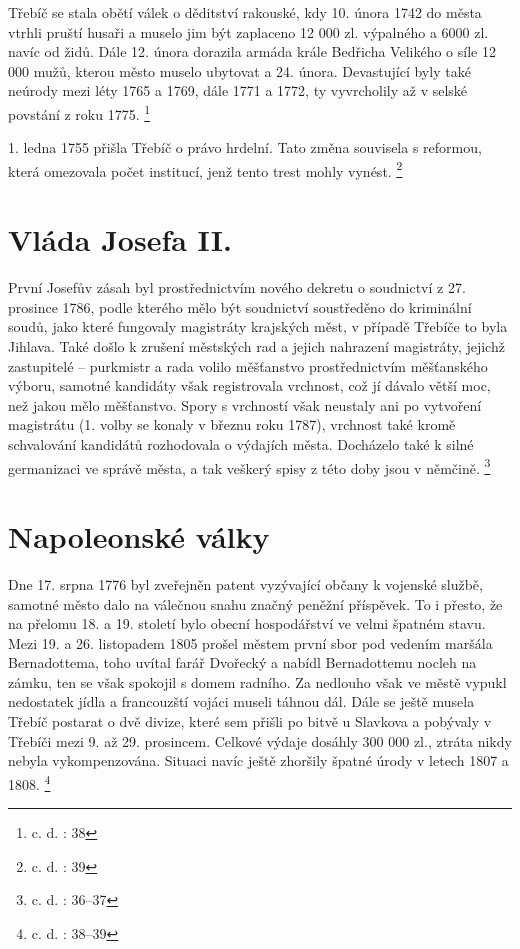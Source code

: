 \documentclass[a4paper,oneside,12p]{report}
\begin{document}
Třebíč se stala obětí válek o děditství rakouské, kdy 10. února 1742 do města vtrhli pruští husaři a muselo jim být zaplaceno 12 000 zl. výpalného a 6000 zl. navíc od židů.
Dále 12. února dorazila armáda krále Bedřicha Velikého o síle 12 000 mužů, kterou město muselo ubytovat a 24. února.
Devastující byly také neúrody mezi léty 1765 a 1769, dále 1771 a 1772, ty vyvrcholily až v selské povstání z roku 1775. \footnote{c. d. : 38}

1. ledna 1755 přišla Třebíč o právo hrdelní.
Tato změna souvisela s reformou, která omezovala počet institucí, jenž tento trest mohly vynést. \footnote{c. d. : 39}

\section{Vláda Josefa II.}

První Josefův zásah byl prostřednictvím nového dekretu o soudnictví z 27. prosince 1786, podle kterého mělo být soudnictví soustředěno do kriminální soudů, jako které fungovaly magistráty krajských měst, v případě Třebíče to byla Jihlava.
Také došlo k zrušení městských rad a jejich nahrazení magistráty, jejichž zastupitelé -- purkmistr a rada volilo měšťanstvo prostřednictvím měšťanského výboru, samotné kandidáty však registrovala vrchnost, což jí dávalo větší moc, než jakou mělo měšťanstvo.
Spory s vrchností však neustaly ani po vytvoření magistrátu (1. volby se konaly v březnu roku 1787), vrchnost také kromě schvalování kandidátů rozhodovala o výdajích města.
Docházelo také k silné germanizaci ve správě města, a tak veškerý spisy z této doby jsou v němčině. \footnote{c. d. : 36--37}

\section{Napoleonské války}

Dne 17. srpna 1776 byl zveřejněn patent vyzývající občany k vojenské službě, samotné město dalo na válečnou snahu značný peněžní příspěvek.
To i přesto, že na přelomu 18. a 19. století bylo obecní hospodářství ve velmi špatném stavu.
Mezi 19. a 26. listopadem 1805 prošel městem první sbor pod vedením maršála Bernadottema, toho uvítal farář Dvořecký a nabídl Bernadottemu nocleh na zámku, ten se však spokojil s domem radního.
Za nedlouho však ve městě vypukl nedostatek jídla a francouzští vojáci museli táhnou dál.
Dále se ještě musela Třebíč postarat o dvě divize, které sem přišli po bitvě u Slavkova a pobývaly v Třebíči mezi 9. až 29. prosincem.
Celkové výdaje dosáhly 300 000 zl., ztráta nikdy nebyla vykompenzována.
Situaci navíc ještě zhoršily špatné úrody v letech 1807 a 1808. \footnote{c. d. : 38--39}
\end{document}
